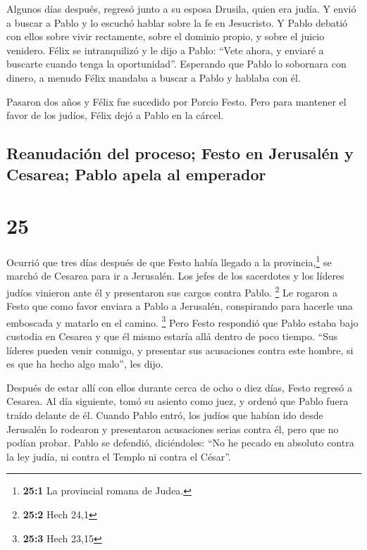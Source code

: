  Algunos días después, regresó junto a su esposa Drusila,
quien era judía. Y envió a buscar a Pablo y lo escuchó hablar sobre la
fe en Jesucristo.  Y Pablo debatió con ellos sobre vivir
rectamente, sobre el dominio propio, y sobre el juicio venidero. Félix
se intranquilizó y le dijo a Pablo: ``Vete ahora, y enviaré a buscarte
cuando tenga la oportunidad''.  Esperando que Pablo lo
sobornara con dinero, a menudo Félix mandaba a buscar a Pablo y hablaba
con él.

 Pasaron dos años y Félix fue sucedido por Porcio Festo.
Pero para mantener el favor de los judíos, Félix dejó a Pablo en la
cárcel.

\hypertarget{reanudaciuxf3n-del-proceso-festo-en-jerusaluxe9n-y-cesarea-pablo-apela-al-emperador}{%
\subsection{Reanudación del proceso; Festo en Jerusalén y Cesarea; Pablo
apela al
emperador}\label{reanudaciuxf3n-del-proceso-festo-en-jerusaluxe9n-y-cesarea-pablo-apela-al-emperador}}

\hypertarget{section-24}{%
\section{25}\label{section-24}}

 Ocurrió que tres días después de que Festo había llegado
a la provincia,\footnote{\textbf{25:1} La provincial romana de Judea.}
se marchó de Cesarea para ir a Jerusalén.  Los jefes de
los sacerdotes y los líderes judíos vinieron ante él y presentaron sus
cargos contra Pablo. \footnote{\textbf{25:2} Hech 24,1} 
Le rogaron a Festo que como favor enviara a Pablo a Jerusalén,
conspirando para hacerle una emboscada y matarlo en el camino.
\footnote{\textbf{25:3} Hech 23,15}  Pero Festo respondió
que Pablo estaba bajo custodia en Cesarea y que él mismo estaría allá
dentro de poco tiempo.  ``Sus líderes pueden venir
conmigo, y presentar sus acusaciones contra este hombre, si es que ha
hecho algo malo'', les dijo.

 Después de estar allí con ellos durante cerca de ocho o
diez días, Festo regresó a Cesarea. Al día siguiente, tomó su asiento
como juez, y ordenó que Pablo fuera traído delante de él. 
Cuando Pablo entró, los judíos que habían ido desde Jerusalén lo
rodearon y presentaron acusaciones serias contra él, pero que no podían
probar.  Pablo se defendió, diciéndoles: ``No he pecado en
absoluto contra la ley judía, ni contra el Templo ni contra el César''.

